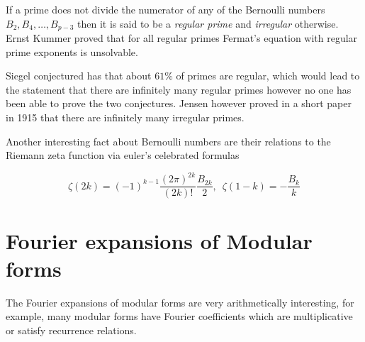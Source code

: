 If a prime does not divide the numerator of any of the Bernoulli
numbers $B_2,B_4,\ldots,B_{p-3}$ then it is said to be a 
\textit{regular prime} and \textit{irregular} otherwise. 
Ernst Kummer proved that for all regular primes Fermat's equation
with regular prime exponents is unsolvable.

\mb 

Siegel conjectured has that about $61\%$ of primes 
are regular, which would lead to the statement that there are 
infinitely many regular primes however no one has been able to 
prove the two conjectures. Jensen however proved in a short paper in 1915 
that there are infinitely many irregular primes.

\mb

Another interesting fact about Bernoulli numbers are their relations
to the Riemann zeta function via euler's celebrated formulas

\[\zeta(2k) = (-1)^{k-1}\frac{(2\pi)^{2k}}{(2k)!}\frac{B_{2k}}{2}, \,\,\, \zeta(1-k) = -\frac{B_k}{k}\]

\section{Fourier expansions of Modular forms}

The Fourier expansions of modular forms are very arithmetically interesting, for example,
many modular forms have Fourier coefficients which are multiplicative or satisfy
recurrence relations. 


